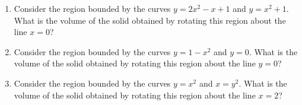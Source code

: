 \begin{enumerate}[ref={\fcProblemRef}]~
\item  \label{problemVolumeRegionBoundedByy=2x^2-x+1,y=x^2+1rotatedAroundx=0} Consider the region bounded by the curves $y = 2x^2-x+1$ and $y =x^2+1$. What is the volume of the solid obtained by rotating this region about the line $x = 0$?


\item Consider the region bounded by the curves $y = 1-x^2$ and $y =0$. What is the volume of the solid obtained by
rotating this region about the line $y = 0$?

\item Consider the region bounded by the curves $y = x^2$ and $x = y^2$. What is the volume of the solid obtained by
rotating this region about the line $x = 2$?



\end{enumerate}
